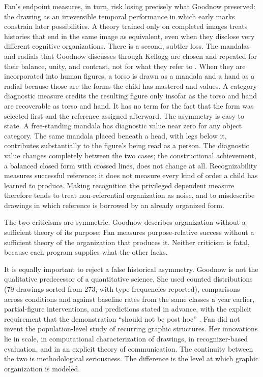 \documentclass[11pt]{article}
\theoremstyle{remark}
\begin{document}
Fan's endpoint measures, in turn, risk losing precisely what Goodnow preserved: the drawing as an irreversible temporal performance in which early marks constrain later possibilities. A theory trained only on completed images treats histories that end in the same image as equivalent, even when they disclose very different cognitive organizations. There is a second, subtler loss. The mandalas and radials that Goodnow discusses through Kellogg are chosen and repeated for their balance, unity, and contrast, not for what they refer to \cite[pp.~35--36]{goodnow1977}. When they are incorporated into human figures, a torso is drawn as a mandala and a hand as a radial because those are the forms the child has mastered and values. A category-diagnostic measure credits the resulting figure only insofar as the torso and hand are recoverable as torso and hand. It has no term for the fact that the form was selected first and the reference assigned afterward. The asymmetry is easy to state. A free-standing mandala has diagnostic value near zero for any object category. The same mandala placed beneath a head, with legs below it, contributes substantially to the figure's being read as a person. The diagnostic value changes completely between the two cases; the constructional achievement, a balanced closed form with crossed lines, does not change at all. Recognizability measures successful reference; it does not measure every kind of order a child has learned to produce. Making recognition the privileged dependent measure therefore tends to treat non-referential organization as noise, and to misdescribe drawings in which reference is borrowed by an already organized form.

The two criticisms are symmetric. Goodnow describes organization without a sufficient theory of its purpose; Fan measures purpose-relative success without a sufficient theory of the organization that produces it. Neither criticism is fatal, because each program supplies what the other lacks.

It is equally important to reject a false historical asymmetry. Goodnow is not the qualitative predecessor of a quantitative science. She used counted distributions (79 drawings sorted from 273, with type frequencies reported), comparisons across conditions and against baseline rates from the same classes a year earlier, partial-figure interventions, and predictions stated in advance, with the explicit requirement that the demonstration ``should not be post hoc'' \cite[pp.~50, 52, 61]{goodnow1977}. Fan did not invent the population-level study of recurring graphic structures. Her innovations lie in scale, in computational characterization of drawings, in recognizer-based evaluation, and in an explicit theory of communication. The continuity between the two is methodological seriousness. The difference is the level at which graphic organization is modeled.
\end{document}
